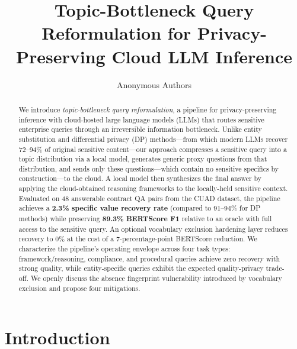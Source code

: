 \documentclass[sigconf,anonymous,review,balance=false]{acmart}
\begin{document}
\title[Topic-Bottleneck Query Reformulation]{Topic-Bottleneck Query Reformulation for Privacy-Preserving Cloud LLM Inference}

\author{Anonymous Authors}

\begin{abstract}
We introduce \emph{topic-bottleneck query reformulation}, a pipeline for privacy-preserving inference with cloud-hosted large language models (LLMs) that routes sensitive enterprise queries through an irreversible information bottleneck.
Unlike entity substitution and differential privacy (DP) methods---from which modern LLMs recover 72--94\% of original sensitive content---our approach compresses a sensitive query into a topic distribution via a local model, generates generic proxy questions from that distribution, and sends only these questions---which contain no sensitive specifics by construction---to the cloud.
A local model then synthesizes the final answer by applying the cloud-obtained reasoning frameworks to the locally-held sensitive context.
Evaluated on 48 answerable contract QA pairs from the CUAD dataset, the pipeline achieves a \textbf{2.3\% specific value recovery rate} (compared to 91--94\% for DP methods) while preserving \textbf{89.3\% BERTScore F1} relative to an oracle with full access to the sensitive query.
An optional vocabulary exclusion hardening layer reduces recovery to 0\% at the cost of a 7-percentage-point BERTScore reduction.
We characterize the pipeline's operating envelope across four task types: framework/reasoning, compliance, and procedural queries achieve zero recovery with strong quality, while entity-specific queries exhibit the expected quality-privacy trade-off.
We openly discuss the absence fingerprint vulnerability introduced by vocabulary exclusion and propose four mitigations.
\end{abstract}


\maketitle

\section{Introduction}
\label{sec:intro}
\end{document}

